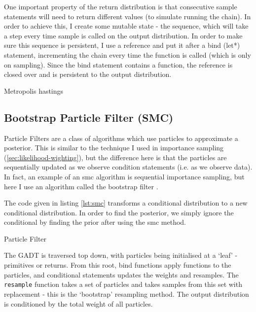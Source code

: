 One important property of the return distribution is that consecutive sample statements will need to return different values (to simulate running the chain). In order to achieve this, I create some mutable state - the sequence, which will take a step every time sample is called on the output distribution. In order to make sure this sequence is persistent, I use a reference and put it after a bind (let*) statement, incrementing the chain every time the function is called (which is only on sampling). Since the bind statement contains a function, the reference is closed over and is persistent to the output distribution.
				
\begin{listing}[H]
	\centering
	\caption{Metropolis hastings}
	\label{lst:mh}
\end{listing}
				
\FloatBarrier
			
\subsection{Bootstrap Particle Filter (SMC)} \label{sec:pf}
Particle Filters are a class of algorithms which use particles to approximate a posterior. This is similar to the technique I used in importance sampling (\ref{sec:likelihood-wighting}), but the difference here is that the particles are sequentially updated as we observe condition statements (i.e. as we observe data). In fact, an example of an smc algorithm is sequential importance sampling, but here I use an algorithm called the bootstrap filter \cite{particlefilter}.
				
The code given in listing \ref{lst:smc} transforms a conditional distribution to a new conditional distribution. In order to find the posterior, we simply ignore the conditional by finding the prior after using the smc method.
				
\begin{listing}[!htb]
	\centering
	\caption{Particle Filter}
	\label{lst:smc}
\end{listing}
				
The GADT is traversed top down, with particles being initialised at a `leaf' - primitives or returns. From this root, bind functions apply functions to the particles, and conditional statements updates the weights and resamples. The \texttt{resample} function takes a set of particles and takes samples from this set with replacement - this is the `bootstrap' resampling method. The output distribution is conditioned by the total weight of all particles.
				
